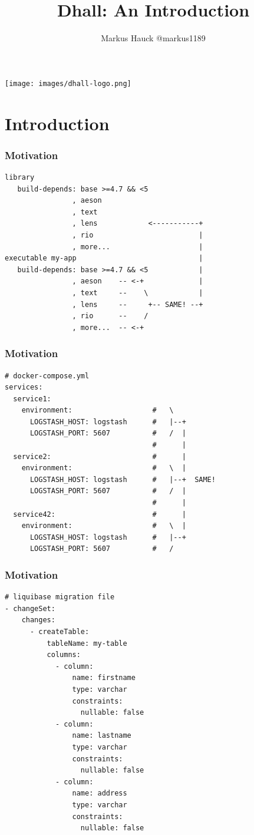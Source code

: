 \documentclass{beamer}
\title{Dhall: An Introduction}
\author{Markus Hauck @markus1189}
\begin{document}
\begin{frame}
  \begin{center}
    \texttt{[image: images/dhall-logo.png]}
  \end{center}
  \titlepage{}
\end{frame}

\section{Introduction}\label{sec:introduction}

\begin{frame}[fragile]
  \frametitle{Motivation}
  \begin{verbatim}
library
   build-depends: base >=4.7 && <5
                , aeson
                , text
                , lens            <-----------+
                , rio                         |
                , more...                     |
executable my-app                             |
   build-depends: base >=4.7 && <5            |
                , aeson    -- <-+             |
                , text     --    \            |
                , lens     --     +-- SAME! --+
                , rio      --    /
                , more...  -- <-+
  \end{verbatim}
\end{frame}

\begin{frame}[fragile]
  \frametitle{Motivation}
  \begin{verbatim}
# docker-compose.yml
services:
  service1:
    environment:                   #   \
      LOGSTASH_HOST: logstash      #   |--+
      LOGSTASH_PORT: 5607          #   /  |
                                   #      |
  service2:                        #      |
    environment:                   #   \  |
      LOGSTASH_HOST: logstash      #   |--+  SAME!
      LOGSTASH_PORT: 5607          #   /  |
                                   #      |
  service42:                       #      |
    environment:                   #   \  |
      LOGSTASH_HOST: logstash      #   |--+
      LOGSTASH_PORT: 5607          #   /
  \end{verbatim}
\end{frame}

\begin{frame}[fragile]
  \frametitle{Motivation}
  \begin{verbatim}
# liquibase migration file
- changeSet:
    changes:
      - createTable:
          tableName: my-table
          columns:
            - column:
                name: firstname
                type: varchar
                constraints:
                  nullable: false
            - column:
                name: lastname
                type: varchar
                constraints:
                  nullable: false
            - column:
                name: address
                type: varchar
                constraints:
                  nullable: false
  \end{verbatim}
\end{frame}
\end{document}
